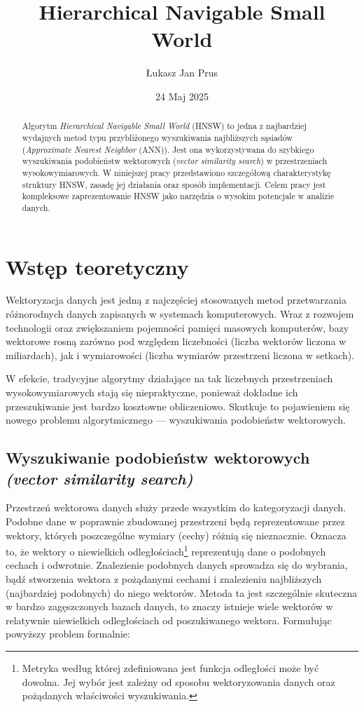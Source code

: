 \documentclass[twocolumn]{article}
\title{Hierarchical Navigable Small World}
\author{Łukasz Jan Prus}
\date{24 Maj 2025}
\begin{document}
\maketitle

\begin{abstract}
Algorytm \textit{Hierarchical Navigable Small World} (HNSW) to jedna z najbardziej wydajnych metod typu przybliżonego wyszukiwania najbliższych sąsiadów (\textit{Approximate Nearest Neighbor} (ANN)). Jest ona wykorzystywana do szybkiego wyszukiwania podobieństw wektorowych (\textit{vector similarity search}) w przestrzeniach wysokowymiarowych. W niniejszej pracy przedstawiono szczegółową charakterystykę struktury HNSW, zasadę jej działania oraz sposób implementacji. Celem pracy jest kompleksowe zaprezentowanie HNSW jako narzędzia o wysokim potencjale w analizie danych.
\end{abstract}

\section{Wstęp teoretyczny}
Wektoryzacja danych jest jedną z najczęściej stosowanych metod przetwarzania różnorodnych danych zapisanych w systemach komputerowych. Wraz z rozwojem technologii oraz zwiększaniem pojemności pamięci masowych komputerów, bazy wektorowe rosną zarówno pod względem liczebności (liczba wektorów liczona w miliardach), jak i wymiarowości (liczba wymiarów przestrzeni liczona w setkach). 

W efekcie, tradycyjne algorytmy działające na tak liczebnych przestrzeniach wysokowymiarowych stają się niepraktyczne, ponieważ dokładne ich przeszukiwanie jest bardzo kosztowne obliczeniowo. Skutkuje to pojawieniem się nowego problemu algorytmicznego — wyszukiwania podobieństw wektorowych.

\subsection{Wyszukiwanie podobieństw wektorowych \newline \textit{(vector similarity search)}}
Przestrzeń wektorowa danych służy przede wszystkim do kategoryzacji danych. Podobne dane w poprawnie zbudowanej przestrzeni będą reprezentowane przez wektory, których poszczególne wymiary (cechy) różnią się nieznacznie. Oznacza to, że wektory o niewielkich odległościach\footnote{Metryka według której zdefiniowana jest funkcja odległości może być dowolna. Jej wybór jest zależny od sposobu wektoryzowania danych oraz pożądanych właściwości wyszukiwania.} reprezentują dane o podobnych cechach i odwrotnie.
\newline
Znalezienie podobnych danych sprowadza się do wybrania, bądź stworzenia wektora z pożądanymi cechami i znalezieniu najbliższych (najbardziej podobnych) do niego wektorów. Metoda ta jest szczególnie skuteczna w bardzo zagęszczonych bazach danych, to znaczy istnieje wiele wektorów w relatywnie niewielkich odległościach od poszukiwanego wektora.
\newline\newline
Formułując powyższy problem formalnie:
\end{document}
